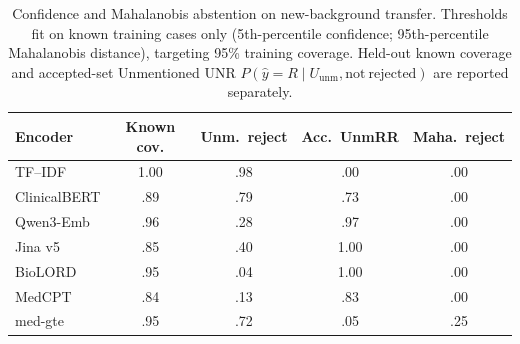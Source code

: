 \documentclass[11pt]{article}
\begin{document}
\begin{table}[t]
  \centering
  \scriptsize
  \setlength{\tabcolsep}{2pt}
  \renewcommand{\arraystretch}{1.05}
  \caption{Confidence and Mahalanobis abstention on new-background transfer.
  Thresholds fit on known training cases only (5th-percentile confidence;
  95th-percentile Mahalanobis distance), targeting 95\% training coverage.
  Held-out known coverage and accepted-set Unmentioned UNR
  $P(\hat{y}{=}R \mid U_{\mathrm{unm}}, \mathrm{not\ rejected})$ are reported
  separately.}
  \label{tab:abstention}
  \begin{tabular*}{\columnwidth}{@{\extracolsep{\fill}}lcccc@{}}
    \toprule
    \textbf{Encoder} & \textbf{Known cov.} &
    \textbf{Unm.\ reject} & \textbf{Acc.\ UnmRR} &
    \textbf{Maha.\ reject} \\
    \midrule
    TF--IDF      & 1.00 & .98 & .00 & .00 \\
    ClinicalBERT & .89 & .79 & .73 & .00 \\
    Qwen3-Emb    & .96 & .28 & .97 & .00 \\
    Jina v5      & .85 & .40 & 1.00 & .00 \\
    BioLORD      & .95 & .04 & 1.00 & .00 \\
    MedCPT       & .84 & .13 & .83 & .00 \\
    med-gte      & .95 & .72 & .05 & .25 \\
    \bottomrule
  \end{tabular*}
\end{table}
\end{document}
